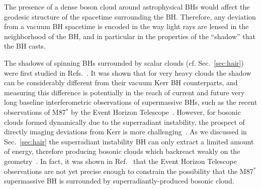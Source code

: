 \documentclass[11pt]{article}
\numberwithin{equation}{section} %
\begin{document}
The presence of a dense boson cloud around astrophysical BHs would affect the geodesic structure of the spacetime surrounding the BH. Therefore, any deviation from a vacuum BH spacetime is encoded in the way light rays are lensed in the neighborhood of the BH, and in particular in the properties of the ``shadow'' that the BH casts. 

The shadows of spinning BHs surrounded by scalar clouds (cf. Sec.~\ref{sec:hair}) were first studied in Refs.~\cite{Cunha:2015yba,Cunha:2016bpi,Vincent:2016sjq}. It was shown that for very heavy clouds the shadow can be considerably different from their vacuum Kerr BH counterparts, and measuring this difference is potentially in the reach of current and future very long baseline interferometric observations of supermassive BHs, such as the recent observations of M87$^{*}$ by the Event Horizon Telescope~\cite{Akiyama:2019cqa}. However, for bosonic clouds formed dynamically due to the superradiant instability, the prospect of directly imaging deviations from Kerr is more challenging~\cite{Cunha:2015yba,Vincent:2016sjq,Cunha:2019ikd,Creci:2020mfg}. As we discussed in Sec.~\ref{sec:hair} the superradiant instability BH can only extract a limited amount of energy, therefore producing bosonic clouds which backreact weakly on the geometry~\cite{Brito:2014wla}. In fact, it was shown in Ref.~\cite{Cunha:2019ikd} that the Event Horizon Telescope observations are not yet precise enough to constrain the possibility that the M87$^{*}$ supermassive BH is surrounded by superradiantly-produced bosonic cloud.
\end{document}
